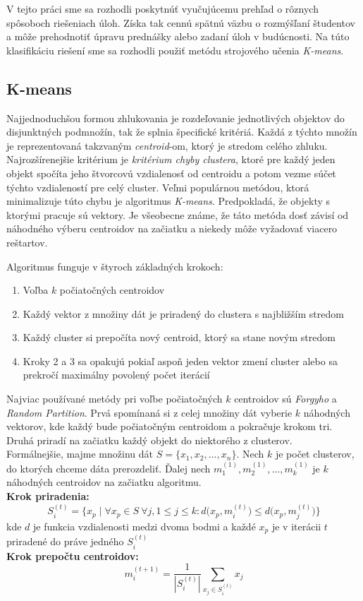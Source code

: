 V tejto práci sme sa rozhodli poskytnúť vyučujúcemu prehľad o
rôznych spôsoboch riešeniach úloh. Získa tak cennú spätnú väzbu o rozmýšľaní študentov
a môže prehodnotiť úpravu prednášky alebo zadaní úloh v budúcnosti. Na túto klasifikáciu riešení
sme sa rozhodli použiť metódu strojového učenia \textit{K-means}.

\subsection{K-means}
\label{sec:solutionclusterizing:kmeans}

Najjednoduchšou formou zhlukovania je rozdeľovanie jednotlivých objektov do
disjunktných podmnožín, tak že splnia špecifické kritériá. Každá z týchto množín je reprezentovaná takzvaným \textit{centroid}-om, ktorý je stredom celého zhluku.
Najrozšírenejšie kritérium je \textit{kritérium chyby clustera}, ktoré pre každý
jeden objekt spočíta jeho štvorcovú vzdialenosť od centroidu a potom vezme
súčet týchto vzdialeností pre celý cluster. Veľmi populárnou metódou, ktorá minimalizuje
túto chybu je algoritmus \textit{K-means}. Predpokladá, že objekty s ktorými pracuje
sú vektory. Je všeobecne známe, že táto metóda dosť
závisí od náhodného výberu centroidov na začiatku a niekedy môže vyžadovať viacero
reštartov.~\cite{bib:globalkmeans}

Algoritmus funguje v štyroch základných krokoch:
\begin{enumerate}
	\item Voľba $k$ počiatočných centroidov
	\item Každý vektor z množiny dát je priradený do clustera s najbližším stredom
	\item Každý cluster si prepočíta nový centroid, ktorý sa stane novým stredom
	\item Kroky 2 a 3 sa opakujú pokiaľ aspoň jeden vektor zmení cluster alebo
		sa prekročí maximálny povolený počet iterácií
\end{enumerate}

Najviac používané metódy pri voľbe počiatočných $k$ centroidov sú \textit{Forgyho} a
\textit{Random Partition}. Prvá spomínaná si z celej množiny dát vyberie $k$ náhodných
vektorov, kde každý bude počiatočným centroidom a pokračuje krokom tri.
Druhá priradí na začiatku každý objekt do niektorého z clusterov. \\

Formálnejšie, majme množinu dát $S=\{x_1, x_2, \ldots , x_n\}$. Nech $k$ je počet
clusterov, do ktorých chceme dáta prerozdeliť. Ďalej nech
$m_1^{(1)}, m_2^{(1)}, \ldots, m_k^{(1)}$ je $k$ náhodných centroidov na začiatku
algoritmu.\\
\textbf{Krok priradenia:}
$$S_i^{(t)}=\Big\{ x_p \mid
\forall x_p\in S~
\forall j, 1\leq j \leq k:
{d\big(x_p, m_i^{(t)}\big)} \leq 
{d\big(x_p, m_j^{(t)}\big)}\Big\}$$
kde $d$ je funkcia vzdialenosti medzi dvoma bodmi a každé $x_p$ je v iterácii $t$
priradené do práve jedného $S_i^{(t)}$ \\
\textbf{Krok prepočtu centroidov:}
$$m_i^{(t+1)}=\frac{1}{|S_i^{(t)}|} \sum_{x_j\in S_i^{(t)}} x_j$$

